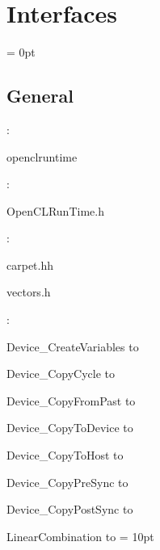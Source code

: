 
\section{Interfaces} 


\parskip = 0pt

\vspace{3mm} \subsection*{General}

: 

openclruntime
\vspace{2mm}

\vspace{5mm}

: 



OpenCLRunTime.h
\vspace{2mm}

: 

carpet.hh

vectors.h
\vspace{2mm}

: 



Device\_CreateVariables to 

Device\_CopyCycle to 

Device\_CopyFromPast to 

Device\_CopyToDevice to 

Device\_CopyToHost to 

Device\_CopyPreSync to 

Device\_CopyPostSync to 

LinearCombination to 
\vspace{2mm}\parskip = 10pt 
